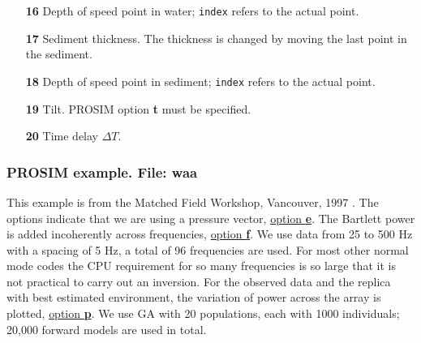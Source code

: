 \documentclass{saclantc}
\begin{document}
\begin{itemize}
    \item[\bf 16]  Depth of speed point  in water;
               {\tt index} refers to the actual point.
\vspace{-0.3cm}
    \item[\bf 17] Sediment thickness. The thickness is changed by moving the last 
point in the sediment. 
\vspace{-0.3cm}
  \item[\bf 18]  Depth of speed point  in sediment;
               {\tt index} refers to the actual point.
\vspace{-0.3cm}
    \item[\bf 19] Tilt. {\sf PROSIM} option {\bf t} must be specified.
\vspace{-0.3cm}
    \item[\bf 20] Time delay $\Delta T$. 
\end{itemize}

\subsubsection{PROSIM example. File: {\bf waa}}

\label{se:waa} 
This example is from the Matched Field Workshop,
Vancouver, 1997 \cite{chapman}.
The options indicate that we are using a pressure vector, 
\underline{option {\bf e}}. 
The Bartlett power is added incoherently across frequencies, 
\underline{option {\bf f}}.  
We use data from 25 to 500 Hz with a spacing of 5 Hz, a total of 96
frequencies are used. For most other normal mode codes the CPU
requirement for so many frequencies is so large that it is not
practical to carry out an inversion.
For the observed data and the replica with best estimated environment,
the variation of power across the array is plotted, \underline{option {\bf p}}.
We use GA with 20 populations,
each with 1000 individuals; 20,000 forward models are used in total.
\end{document}
